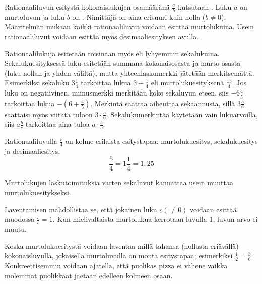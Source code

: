 Rationaaliluvun esitystä kokonaislukujen osamääränä
$\frac{a}{b}$ kutsutaan . Luku $a$ on murtoluvun
 ja luku $b$ on
. Nimittäjä on aina erisuuri kuin nolla ($b\neq0 $). Määritelmän mukaan kaikki rationaaliluvut
voidaan esittää murtolukuina.  Usein rationaaliluvut voidaan esittää myös desimaaliesityksen avulla.


Rationaalilukuja esitetään toisinaan myös  eli lyhyemmin
sekalukuina. Sekalukuesityksessä luku esitetään summana kokonaisosasta ja murto-osasta (luku nollan
ja yhden väliltä), mutta yhteenlaskumerkki jätetään merkitsemättä. Esimerkiksi sekaluku $3\frac{1}{4}$
tarkoittaa lukua $3 + \frac{1}{4}$ eli murtolukuesityksenä $\frac{13}{4}$. Jos luku on negatiivinen,
miinusmerkki merkitään koko sekaluvun eteen, siis $-6\frac{4}{5}$ tarkoittaa lukua $-(6 + \frac{4}{5})$.
Merkintä saattaa aiheuttaa sekaannusta, sillä $3\frac{5}{6}$ saattaisi myös viitata tuloon
$3\cdot \frac{5}{6}$. Sekalukumerkintää käytetään vain lukuarvoilla, siis $a\frac{b}{c}$ tarkoittaa aina
tuloa $a\cdot \frac{b}{c}$. 

\begin{esimerkki}
        Rationaaliluvulla $\frac{5}{4}$ on kolme erilaista esitystapaa: murtolukuesitys, sekalukuesitys ja desimaaliesitys.
        \[\frac{5}{4} = 1\frac{1}{4}=1,25 \]
    \end{esimerkki}

Murtolukujen laskutoimituksia varten sekaluvut kannattaa usein muuttaa murtolukuesitykseksi. 


Laventamisen mahdollistaa se, että jokainen luku $c(\neq0)$ voidaan esittää muodossa $\frac{c}{c}=1$. Kun mielivaltaista murtolukua
kerrotaan luvulla $1$, luvun arvo ei muutu. 

Koska murtolukuesitystä voidaan laventaa millä tahansa (nollasta eriävällä) kokonaisluvulla, jokaisella murtoluvulla on monta esitystapaa;
esimerkiksi $\frac{1}{2}=\frac{3}{6}$. Konkreettisemmin voidaan ajatella, että puolikas pizza ei vähene vaikka molemmat 
puolikkaat jaetaan edelleen kolmeen osaan.

